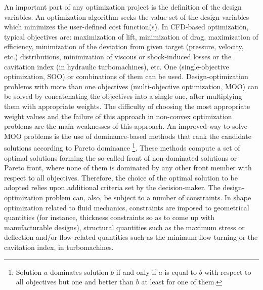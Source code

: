 An important part of any optimization project is the definition of the design variables. An optimization algorithm seeks the value set of the design variables which minimizes the user-defined cost function(s).  In CFD-based optimization, typical objectives are: maximization of lift,  minimization of drag,  maximization of efficiency, minimization of the deviation from given target (pressure, velocity, etc.) distributions, minimization of viscous or shock-induced losses or the cavitation index (in hydraulic turbomachines), etc. One (single-objective optimization, SOO) or combinations of them can be used. Design-optimization problems with more than one objectives (multi-objective optimization, MOO) can be solved by concatenating the objectives into a single one, after multiplying them with appropriate weights. The difficulty of choosing the most appropriate weight values and the failure of this approach in non-convex optimization problems are the main weaknesses of this approach.  An improved way to solve MOO problems is the use of dominance-based methods that rank the candidate solutions according to Pareto dominance \footnote{Solution $a$ dominates solution $b$ if and only if $a$ is equal to $b$ with respect to all objectives but one and better than $b$ at least for one of them.}. These methods compute a set of optimal solutions forming the so-called front of non-dominated solutions or Pareto front, where none of them is dominated by any other front member with respect to all objectives.  Therefore, the choice of the optimal solution to be adopted relies upon additional criteria set by the decision-maker.  The design-optimization problem can, also, be subject to a number of constraints. In shape optimization related to fluid mechanics, constraints are imposed to geometrical quantities (for instance, thickness constraints so as to come up with manufacturable designs), structural quantities such as the maximum stress or deflection and/or flow-related quantities such as the minimum flow turning or the cavitation index, in turbomachines.          

